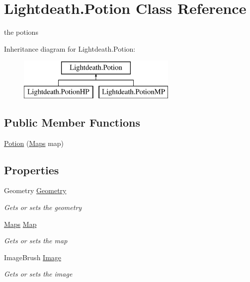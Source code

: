 \hypertarget{class_lightdeath_1_1_potion}{}\section{Lightdeath.\+Potion Class Reference}
\label{class_lightdeath_1_1_potion}


the potions  


Inheritance diagram for Lightdeath.\+Potion\+:\begin{figure}[H]
\begin{center}
\leavevmode
\includegraphics[height=2.000000cm]{class_lightdeath_1_1_potion}
\end{center}
\end{figure}
\subsection*{Public Member Functions}
\begin{DoxyCompactItemize}
\item 
\hyperlink{class_lightdeath_1_1_potion_aa91f25c71ba7a2ea871c214ba806bf84}{Potion} (\hyperlink{class_lightdeath_1_1_maps}{Maps} map)
\end{DoxyCompactItemize}
\subsection*{Properties}
\begin{DoxyCompactItemize}
\item 
Geometry \hyperlink{class_lightdeath_1_1_potion_a1bcf61dc5365e8fa6599fb75c3edcbb2}{Geometry}
\begin{DoxyCompactList}\small\item\em Gets or sets the geometry \end{DoxyCompactList}\item 
\hyperlink{class_lightdeath_1_1_maps}{Maps} \hyperlink{class_lightdeath_1_1_potion_a6175131c094693648e52b06683be60fe}{Map}
\begin{DoxyCompactList}\small\item\em Gets or sets the map \end{DoxyCompactList}\item 
Image\+Brush \hyperlink{class_lightdeath_1_1_potion_aa9c80e31bd4b3c2becc4dbb4c636089f}{Image}
\begin{DoxyCompactList}\small\item\em Gets or sets the image \end{DoxyCompactList}\end{DoxyCompactItemize}


